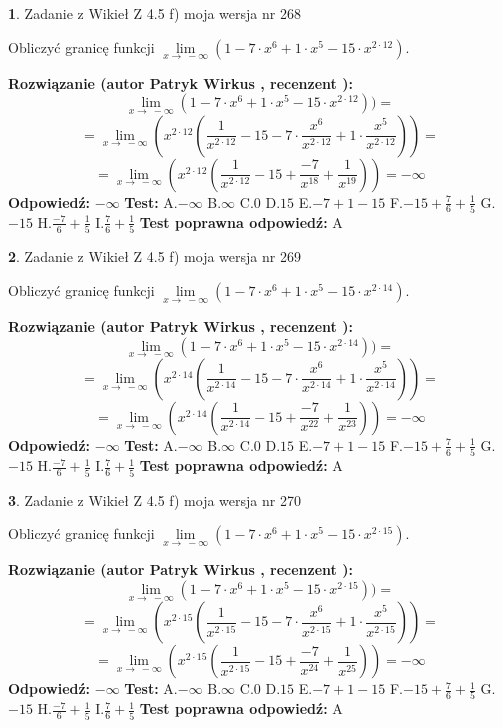 \documentclass[12pt, a4paper]{article}
\theoremstyle{definition} %
\newtheorem{zad}{}
\newcommand{\zadStart}[1]{\begin{zad}#1\newline}
\newcommand{\zadStop}{\end{zad}}
\newcommand{\rozwStart}[2]{\noindent \textbf{Rozwiązanie (autor #1 , recenzent #2): }\newline}
\newcommand{\rozwStop}{\newline}
\newcommand{\odpStart}{\noindent \textbf{Odpowiedź:}\newline}
\newcommand{\odpStop}{\newline}
\newcommand{\testStart}{\noindent \textbf{Test:}\newline}
\newcommand{\testStop}{\newline}
\newcommand{\kluczStart}{\noindent \textbf{Test poprawna odpowiedź:}\newline}
\newcommand{\kluczStop}{\newline}
\begin{document}
\zadStart{Zadanie z Wikieł Z 4.5 f) moja wersja nr 268}



Obliczyć granicę funkcji  $\lim\limits_{x\to\ -\infty}(1 - 7 \cdot x^{6}+1 \cdot x^{5}- 15 \cdot x^{2\cdot12})$.
\zadStop
\rozwStart{Patryk Wirkus}{}
$$\lim\limits_{x\to\ -\infty}(1 - 7 \cdot x^{6}+1 \cdot x^{5}- 15 \cdot x^{2\cdot12}))=$$
$$=\lim\limits_{x\to\ -\infty}(x^{2\cdot12}(\frac{1}{x^{2\cdot12}}-15 -7 \cdot \frac{x^{6}}{x^{2\cdot12}}+1 \cdot \frac{x^{5}}{x^{2\cdot12}}))=$$
$$=\lim\limits_{x\to\ -\infty}(x^{2\cdot12}(\frac{1}{x^{2\cdot12}}-15 + \frac{-7}{x^{18}}+ \frac{1}{x^{19}}))=-\infty$$
\rozwStop
\odpStart
$-\infty$
\odpStop
\testStart
A.$-\infty$ B.$\infty$ C.$0$ D.$15$ E.$-7 + 1 - 15$
F.$-15+\frac{7}{6}+\frac{1}{5}$ G.$-15$
H.$\frac{-7}{6}+\frac{1}{5}$
I.$\frac{7}{6}+\frac{1}{5}$
\testStop
\kluczStart
A
\kluczStop



\zadStart{Zadanie z Wikieł Z 4.5 f) moja wersja nr 269}



Obliczyć granicę funkcji  $\lim\limits_{x\to\ -\infty}(1 - 7 \cdot x^{6}+1 \cdot x^{5}- 15 \cdot x^{2\cdot14})$.
\zadStop
\rozwStart{Patryk Wirkus}{}
$$\lim\limits_{x\to\ -\infty}(1 - 7 \cdot x^{6}+1 \cdot x^{5}- 15 \cdot x^{2\cdot14}))=$$
$$=\lim\limits_{x\to\ -\infty}(x^{2\cdot14}(\frac{1}{x^{2\cdot14}}-15 -7 \cdot \frac{x^{6}}{x^{2\cdot14}}+1 \cdot \frac{x^{5}}{x^{2\cdot14}}))=$$
$$=\lim\limits_{x\to\ -\infty}(x^{2\cdot14}(\frac{1}{x^{2\cdot14}}-15 + \frac{-7}{x^{22}}+ \frac{1}{x^{23}}))=-\infty$$
\rozwStop
\odpStart
$-\infty$
\odpStop
\testStart
A.$-\infty$ B.$\infty$ C.$0$ D.$15$ E.$-7 + 1 - 15$
F.$-15+\frac{7}{6}+\frac{1}{5}$ G.$-15$
H.$\frac{-7}{6}+\frac{1}{5}$
I.$\frac{7}{6}+\frac{1}{5}$
\testStop
\kluczStart
A
\kluczStop



\zadStart{Zadanie z Wikieł Z 4.5 f) moja wersja nr 270}



Obliczyć granicę funkcji  $\lim\limits_{x\to\ -\infty}(1 - 7 \cdot x^{6}+1 \cdot x^{5}- 15 \cdot x^{2\cdot15})$.
\zadStop
\rozwStart{Patryk Wirkus}{}
$$\lim\limits_{x\to\ -\infty}(1 - 7 \cdot x^{6}+1 \cdot x^{5}- 15 \cdot x^{2\cdot15}))=$$
$$=\lim\limits_{x\to\ -\infty}(x^{2\cdot15}(\frac{1}{x^{2\cdot15}}-15 -7 \cdot \frac{x^{6}}{x^{2\cdot15}}+1 \cdot \frac{x^{5}}{x^{2\cdot15}}))=$$
$$=\lim\limits_{x\to\ -\infty}(x^{2\cdot15}(\frac{1}{x^{2\cdot15}}-15 + \frac{-7}{x^{24}}+ \frac{1}{x^{25}}))=-\infty$$
\rozwStop
\odpStart
$-\infty$
\odpStop
\testStart
A.$-\infty$ B.$\infty$ C.$0$ D.$15$ E.$-7 + 1 - 15$
F.$-15+\frac{7}{6}+\frac{1}{5}$ G.$-15$
H.$\frac{-7}{6}+\frac{1}{5}$
I.$\frac{7}{6}+\frac{1}{5}$
\testStop
\kluczStart
A
\kluczStop
\end{document}
